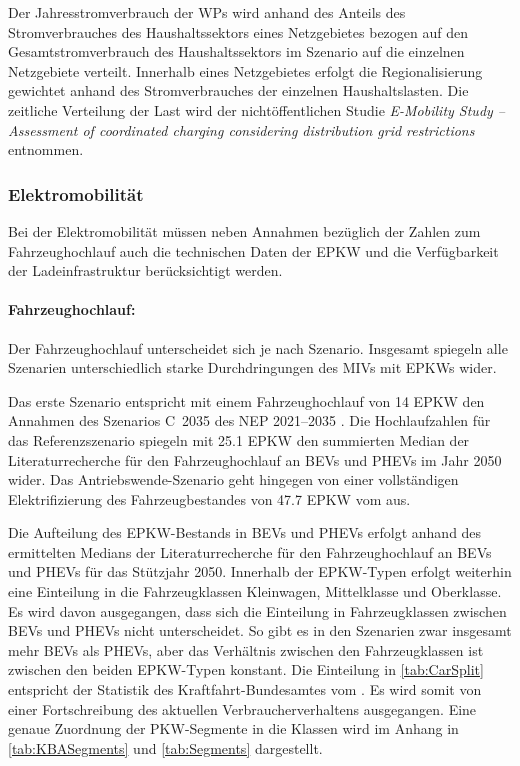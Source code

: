 

Der Jahresstromverbrauch der \glspl{WP} wird anhand des Anteils des Stromverbrauches des Haushaltssektors eines Netzgebietes bezogen auf den Gesamtstromverbrauch des Haushaltssektors im Szenario \ego auf die einzelnen Netzgebiete verteilt.
Innerhalb eines Netzgebietes erfolgt die Regionalisierung gewichtet anhand des Stromverbrauches der einzelnen Haushaltslasten.
Die zeitliche Verteilung der Last wird der nichtöffentlichen Studie \textit{E-Mobility Study {--} Assessment of coordinated charging considering distribution grid restrictions} \cite{Schachler} entnommen.


\subsubsection{Elektromobilität}\label{chap:EMob_Szenarien}

Bei der Elektromobilität müssen neben Annahmen bezüglich der Zahlen zum Fahrzeughochlauf auch die technischen Daten der \gls{EPKW} und die Verfügbarkeit der Ladeinfrastruktur berücksichtigt werden.


\paragraph{Fahrzeughochlauf:}
Der Fahrzeughochlauf unterscheidet sich je nach Szenario.
Insgesamt spiegeln alle Szenarien unterschiedlich starke Durchdringungen des \glspl{MIV} mit \glspl{EPKW} wider.\medskip

Das erste Szenario entspricht mit einem Fahrzeughochlauf von \SI{14}{\Mio} \gls{EPKW} den Annahmen des Szenarios C~\num{2035} des \gls{NEP} \numrange[range-phrase=~{--}~]{2021}{2035} \cite{BNetzA2020}.
Die Hochlaufzahlen für das Referenzszenario spiegeln mit \SI{25.1}{\Mio} \gls{EPKW} den summierten Median der Literaturrecherche für den Fahrzeughochlauf an \glspl{BEV} und \glspl{PHEV} im Jahr \num{2050} wider.
Das Antriebswende-Szenario geht hingegen von einer vollständigen Elektrifizierung des Fahrzeugbestandes von \SI{47.7}{\Mio} \gls{EPKW} vom  \cite{KBA2020} aus.



Die Aufteilung des \gls{EPKW}-Bestands in \glspl{BEV} und \glspl{PHEV} erfolgt anhand des ermittelten Medians der Literaturrecherche für den Fahrzeughochlauf an \glspl{BEV} und \glspl{PHEV} für das Stützjahr \num{2050}.
Innerhalb der \gls{EPKW}-Typen erfolgt weiterhin eine Einteilung in die Fahrzeugklassen Kleinwagen, Mittelklasse und Oberklasse.
Es wird davon ausgegangen, dass sich die Einteilung in Fahrzeugklassen zwischen \glspl{BEV} und \glspl{PHEV} nicht unterscheidet.
So gibt es in den Szenarien zwar insgesamt mehr \glspl{BEV} als \glspl{PHEV}, aber das Verhältnis zwischen den Fahrzeugklassen ist zwischen den beiden \gls{EPKW}-Typen konstant.
Die Einteilung in \autoref{tab:CarSplit} entspricht der Statistik des Kraftfahrt-Bundesamtes \cite{KBASegments2020} vom .
Es wird somit von einer Fortschreibung des aktuellen Verbraucherverhaltens ausgegangen.
Eine genaue Zuordnung der \gls{PKW}-Segmente in die Klassen wird im Anhang in \autoref{tab:KBASegments} und \autoref{tab:Segments} dargestellt.


